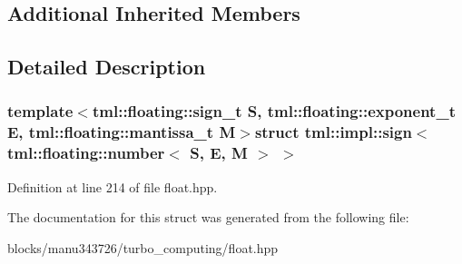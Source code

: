 \subsection*{Additional Inherited Members}


\subsection{Detailed Description}
\subsubsection*{template$<$tml\+::floating\+::sign\+\_\+t S, tml\+::floating\+::exponent\+\_\+t E, tml\+::floating\+::mantissa\+\_\+t M$>$struct tml\+::impl\+::sign$<$ tml\+::floating\+::number$<$ S, E, M $>$ $>$}



Definition at line 214 of file float.\+hpp.



The documentation for this struct was generated from the following file\+:\begin{DoxyCompactItemize}
\item 
blocks/manu343726/turbo\+\_\+computing/float.\+hpp\end{DoxyCompactItemize}
